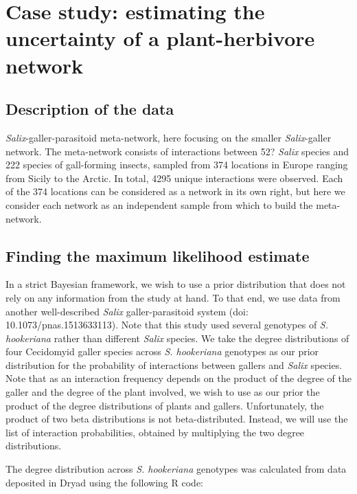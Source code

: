 \documentclass[12pt]{article}
\begin{document}
\section*{Case study: estimating the uncertainty of a plant-herbivore network}

    \subsection*{Description of the data}

      \emph{Salix}-galler-parasitoid meta-network, here focusing on the smaller \emph{Salix}-galler network. The meta-network consists of interactions between 52? \emph{Salix} species and 222 species of gall-forming insects, sampled from 374 locations in Europe ranging from Sicily to the Arctic. In total, 4295 unique interactions were observed. Each of the 374 locations can be considered as a network in its own right, but here we consider each network as an independent sample from which to build the meta-network.


  \subsection*{Finding the maximum likelihood estimate}

      In a strict Bayesian framework, we wish to use a prior distribution that does not rely on any information from the study at hand. To that end, we use data from another well-described \emph{Salix} galler-parasitoid system (doi: 10.1073/pnas.1513633113). Note that this study used several genotypes of \emph{S. hookeriana} rather than different \emph{Salix} species. We take the degree distributions of four Cecidomyid galler species across \emph{S. hookeriana} genotypes as our prior distribution for the probability of interactions between gallers and \emph{Salix} species. Note that as an interaction frequency depends on the product of the degree of the galler and the degree of the plant involved, we wish to use as our prior the product of the degree distributions of plants and gallers.
      Unfortunately, the product of two beta distributions is not beta-distributed. Instead, we will use the list of interaction probabilities, obtained by multiplying the two degree distributions.


      The degree distribution across \emph{S. hookeriana} genotypes was calculated from data deposited in Dryad using the following R code:
\end{document}
